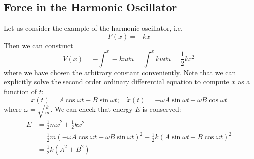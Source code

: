 \documentclass{article}
\begin{document}
\subsection{Force in the Harmonic Oscillator}
Let us consider the example of the harmonic oscillator, i.e.
\[ F(x) = -kx \]
Then we can construct
\[ V(x) = -\int^x -ku \dd{u} = \int^x ku \dd{u} = \frac{1}{2} kx^2 \]
where we have chosen the arbitrary constant conveniently. Note that we can explicitly solve the second order ordinary differential equation to compute $x$ as a function of $t$:
\[ x(t) = A\cos \omega t + B\sin \omega t;\quad \dot x(t) = -\omega A \sin \omega t + \omega B \cos \omega t \]
where $\omega = \sqrt{\frac{k}{m}}$. We can check that energy $E$ is conserved:
\begin{align*}
	E & = \frac{1}{2}m\dot x^2 + \frac{1}{2}kx^2                                                                                                         \\
	  & = \frac{1}{2}m \left( -\omega A \cos \omega t + \omega B \sin \omega t \right)^2 + \frac{1}{2}k \left( A\sin \omega t + B\cos \omega t \right)^2 \\
	  & = \frac{1}{2}k(A^2 + B^2)
\end{align*}
\end{document}
